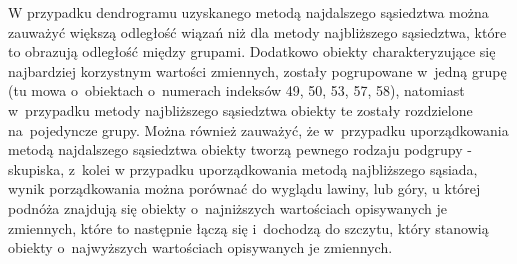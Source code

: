 \documentclass[12pt,a4paper]{report}
\begin{document}
{W przypadku dendrogramu uzyskanego metodą najdalszego sąsiedztwa można
zauważyć większą odległość wiązań niż dla metody najbliższego
sąsiedztwa, które to obrazują odległość między grupami. Dodatkowo
obiekty charakteryzujące się najbardziej korzystnym wartości zmiennych,
zostały pogrupowane w~jedną grupę (tu mowa o~obiektach o~numerach
indeksów 49, 50, 53, 57, 58), natomiast w~przypadku metody najbliższego
sąsiedztwa obiekty te zostały rozdzielone na~pojedyncze grupy. Można
również zauważyć, że w~przypadku uporządkowania metodą najdalszego
sąsiedztwa obiekty tworzą pewnego rodzaju podgrupy - skupiska, z~kolei w
przypadku uporządkowania metodą najbliższego sąsiada, wynik
porządkowania można porównać do wyglądu lawiny, lub góry, u której
podnóża znajdują się obiekty o~najniższych wartościach opisywanych je
zmiennych, które to następnie łączą się i~dochodzą do szczytu, który stanowią
obiekty o~najwyższych wartościach opisywanych je zmiennych.

}
\end{document}

